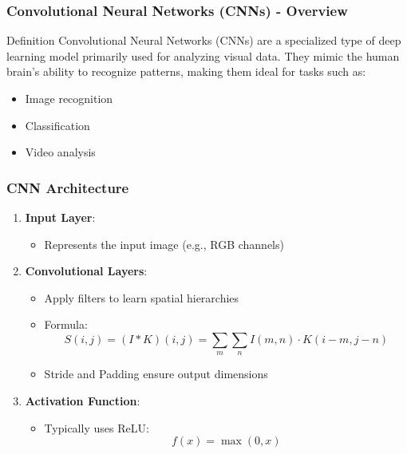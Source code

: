 \documentclass[aspectratio=169]{beamer}
\begin{document}
\begin{frame}[fragile]
    \frametitle{Convolutional Neural Networks (CNNs) - Overview}
    \begin{block}{Definition}
        Convolutional Neural Networks (CNNs) are a specialized type of deep learning model primarily used for analyzing visual data. They mimic the human brain's ability to recognize patterns, making them ideal for tasks such as:
    \end{block}
    \begin{itemize}
        \item Image recognition
        \item Classification
        \item Video analysis
    \end{itemize}
\end{frame}

\begin{frame}[fragile]
    \frametitle{CNN Architecture}
    \begin{enumerate}
        \item \textbf{Input Layer}:
        \begin{itemize}
            \item Represents the input image (e.g., RGB channels)
        \end{itemize}
        
        \item \textbf{Convolutional Layers}:
        \begin{itemize}
            \item Apply filters to learn spatial hierarchies
            \item Formula:
            \begin{equation}
                S(i, j) = (I * K)(i, j) = \sum_m \sum_n I(m, n) \cdot K(i-m, j-n)
            \end{equation}
            \item Stride and Padding ensure output dimensions
        \end{itemize}
        
        \item \textbf{Activation Function}:
        \begin{itemize}
            \item Typically uses ReLU: 
            \begin{equation}
                f(x) = \max(0, x)
            \end{equation}
        \end{itemize}
    \end{enumerate}
\end{frame}
\end{document}
